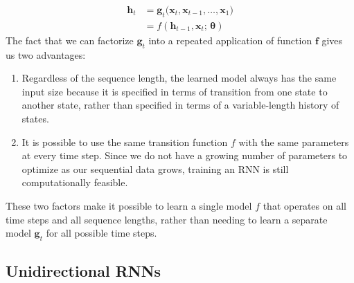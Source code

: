 \documentclass{article}
\theoremstyle{definition}
\theoremstyle{remark}
\theoremstyle{definition}
\begin{document}
\begin{align*}
    \mathbf{h}_t & = \mathbf{g}_t \big( \mathbf{x}_t, \mathbf{x}_{t - 1}, \ldots, \mathbf{x}_1 \big) \\
    & = f(\mathbf{h}_{t - 1}, \mathbf{x}_t; \, \boldsymbol{\theta}) 
\end{align*}
The fact that we can factorize $\mathbf{g}_t$ into a repeated application of function $\mathbf{f}$ gives us two advantages: 
\begin{enumerate}
    \item Regardless of the sequence length, the learned model always has the same input size because it is specified in terms of transition from one state to another state, rather than specified in terms of a variable-length history of states. 

    \item It is possible to use the same transition function $f$ with the same parameters at every time step. Since we do not have a growing number of parameters to optimize as our sequential data grows, training an RNN is still computationally feasible. 
\end{enumerate}
These two factors make it possible to learn a single model $f$ that operates on all time steps and all sequence lengths, rather than needing to learn a separate model $\mathbf{g}_t$ for all possible time steps. 



\subsection{Unidirectional RNNs}
\end{document}
